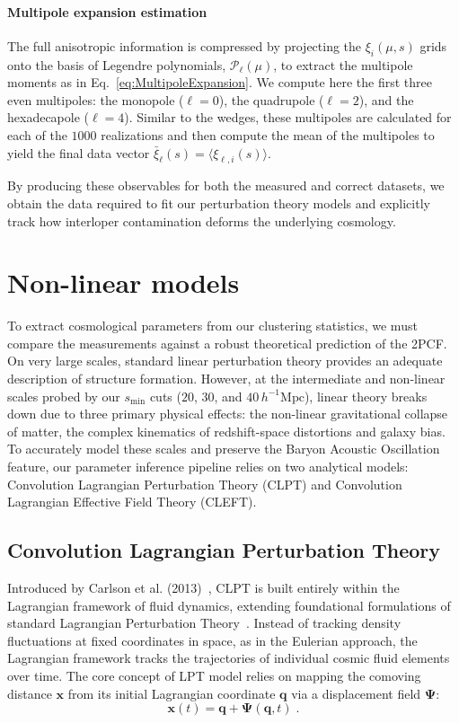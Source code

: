 \documentclass[12pt,a4paper,oneside]{report}
\begin{document}
\paragraph{Multipole expansion estimation}\label{parag:MultipoleExpansionEstimation}
The full anisotropic information is compressed by projecting the $\xi_i(\mu, s)$ grids onto the basis of Legendre polynomials, $\mathcal{P}_\ell(\mu)$, to extract the multipole moments as in Eq.~\eqref{eq:MultipoleExpansion}. We compute here the first three even multipoles: the monopole ($\ell = 0$), the quadrupole ($\ell = 2$), and the hexadecapole ($\ell = 4$). Similar to the wedges, these multipoles are calculated for each of the $1000$ realizations and then compute the mean of the multipoles to yield the final data vector $\bar{\xi}_\ell(s) = \langle \xi_{\ell, i}(s) \rangle$.

By producing these observables for both the measured and correct datasets, we obtain the data required to fit our perturbation theory models and explicitly track how interloper contamination deforms the underlying cosmology.

\section{Non-linear models}\label{sec:NonLinearModels}
To extract cosmological parameters from our clustering statistics, we must compare the measurements against a robust theoretical prediction of the 2PCF. On very large scales, standard linear perturbation theory provides an adequate description of structure formation. However, at the intermediate and non-linear scales probed by our $s_{\mathrm{min}}$ cuts ($20$, $30$, and $40 \,  h^{-1} \mathrm{Mpc}$), linear theory breaks down due to three primary physical effects: the non-linear gravitational collapse of matter, the complex kinematics of redshift-space distortions and galaxy bias. To accurately model these scales and preserve the Baryon Acoustic Oscillation feature, our parameter inference pipeline relies on two analytical models: Convolution Lagrangian Perturbation Theory (CLPT) and Convolution Lagrangian Effective Field Theory (CLEFT).

\subsection{Convolution Lagrangian Perturbation Theory}\label{subsec:CLPT}
Introduced by Carlson et al. (2013)~\cite{CLPT}, CLPT is built entirely within the Lagrangian framework of fluid dynamics, extending foundational formulations of standard Lagrangian Perturbation Theory~\cite{Buchert}. Instead of tracking density fluctuations at fixed coordinates in space, as in the Eulerian approach, the Lagrangian framework tracks the trajectories of individual cosmic fluid elements over time. The core concept of LPT model relies on mapping the comoving distance $\mathbf{x}$ from its initial Lagrangian coordinate $\mathbf{q}$ via a displacement field $\boldsymbol{\Psi}$:
\begin{equation}
  \mathbf{x} (t) = \mathbf{q} + \boldsymbol{\Psi}(\mathbf{q}, t) \; .
  \label{eq:CLPT}
\end{equation}
\end{document}
